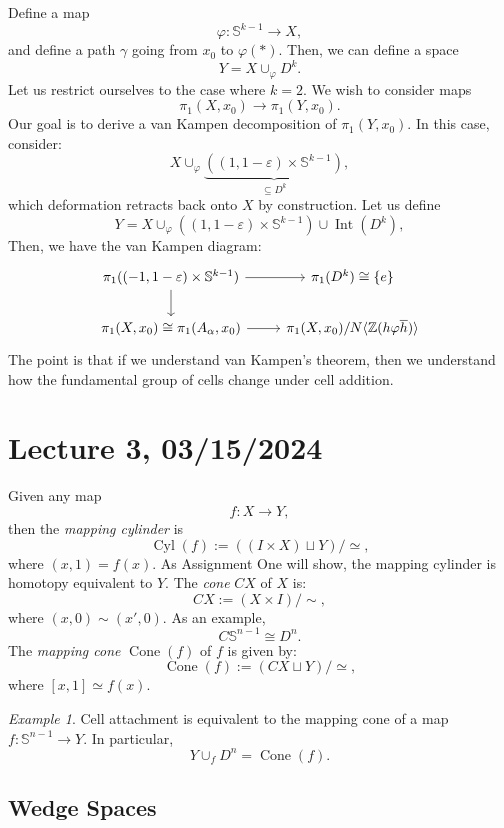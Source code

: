 \documentclass[a4paper]{report}
\theoremstyle{definition}
\theoremstyle{remark}
\theoremstyle{proposition}
\theoremstyle{conjecture}
\theoremstyle{lemma}
\theoremstyle{corollary}
\theoremstyle{exercise}
\newtheorem{example}{Example}
\newcommand{\on}{\operatorname}
\begin{document}
Define a map 
$$\varphi : \mathbb{S}^{k-1} \longrightarrow X,$$
and define a path $\gamma$ going from $x_0$ to $\varphi(\ast)$.
Then, we can define a space
$$Y = X \cup_\varphi D^k.$$
Let us restrict ourselves to the case where $k=2$. We wish to consider 
maps $$\pi_1(X,x_0) \longrightarrow \pi_1(Y,x_0).$$
Our goal is to derive a van Kampen decomposition of 
$\pi_1(Y,x_0)$.
In this case, consider:
$$X \cup_\varphi \underbrace{( (1,1-\varepsilon) \times \mathbb{S}^{k-1})}_{\subseteq D^k},$$ 
which deformation retracts back onto $X$ by construction.
Let us define $$Y = X \cup_\varphi ( (1,1-\varepsilon) \times \mathbb{S}^{k-1}) \cup \on{Int}(D^k),$$ 
Then, we have the van Kampen diagram:
$$\begin{tikzcd}
{\pi_1( (-1,1-\varepsilon) \times \mathbb{S}^{k-1})} \arrow[r] \arrow[d] & \pi_1(D^k) \cong \lbrace e\rbrace                            \\
{\pi_1(X,x_0) \cong \pi_1(A_\alpha,x_0)} \arrow[r]                       & {\pi_1(X,x_0)/N\langle \mathbb{Z} (h\varphi \overline{h})\rangle} 
\end{tikzcd}$$
The point is that if we understand van Kampen's theorem, then we understand
how the fundamental group of cells change under cell addition.

\section{Lecture 3, 03/15/2024}

Given any map $$f: X \longrightarrow Y,$$ 
then the \emph{mapping cylinder} is 
$$\on{Cyl}(f) := ( (I\times X) \sqcup Y)/ \simeq,$$ where $(x,1) = f(x)$.
As Assignment One will show, the mapping cylinder is homotopy equivalent to $Y$.
The \emph{cone} $CX$ of $X$ is:
$$CX := (X\times I)/\sim,$$ where $(x,0) \sim (x',0)$.
As an example,
$$C\mathbb{S}^{n-1} \cong D^n.$$
The \emph{mapping cone} $\on{Cone}(f)$ of $f$ is given by:
$$\on{Cone}(f) := (CX \sqcup Y)/\simeq,$$
where $[x,1] \simeq f(x)$.

\begin{example}
    Cell attachment is equivalent to the mapping cone of a map
    $f : \mathbb{S}^{n-1} \to Y$.
    In particular,$$Y \cup_f D^n = \on{Cone}(f).$$
\end{example}

\subsection{Wedge Spaces}
\end{document}
